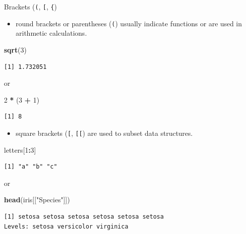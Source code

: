 \documentclass[ignorenonframetext,,t]{beamer}
\let\oldtextbf\textbf
\renewcommand{\textbf}[1]{\textcolor{spamwell}{\oldtextbf{#1}}}
\providecommand{\tightlist}{%
\setlength{\itemsep}{0pt}\setlength{\parskip}{0pt}}
\newenvironment{Shaded}{\begin{snugshade}}{\end{snugshade}}
\newcommand{\DecValTok}[1]{\textcolor[rgb]{0.00,0.00,0.81}{#1}}
\newcommand{\FunctionTok}[1]{\textcolor[rgb]{0.13,0.29,0.53}{\textbf{#1}}}
\newcommand{\NormalTok}[1]{#1}
\newcommand{\SpecialCharTok}[1]{\textcolor[rgb]{0.81,0.36,0.00}{\textbf{#1}}}
\newcommand{\StringTok}[1]{\textcolor[rgb]{0.31,0.60,0.02}{#1}}
\providecommand{\tightlist}{%
\setlength{\itemsep}{0pt}\setlength{\parskip}{0pt}}
\renewcommand{\tightlist}{\setlength{\itemsep}{1.4ex}\setlength{\parskip}{0pt}}
\begin{document}
\begin{frame}[fragile]
\begin{block}{Brackets (\texttt{(}, \texttt{{[}}, \texttt{\{})}
\label{brackets}
\begin{itemize}
\tightlist
\item
  round brackets or parentheses (\texttt{(}) usually indicate functions
  or are used in arithmetic calculations.
\end{itemize}

\begin{Shaded}
\begin{Highlighting}[]
\FunctionTok{sqrt}\NormalTok{(}\DecValTok{3}\NormalTok{)}
\end{Highlighting}
\end{Shaded}

\begin{verbatim}
[1] 1.732051
\end{verbatim}

or

\begin{Shaded}
\begin{Highlighting}[]
\DecValTok{2} \SpecialCharTok{*}\NormalTok{ (}\DecValTok{3} \SpecialCharTok{+} \DecValTok{1}\NormalTok{)}
\end{Highlighting}
\end{Shaded}

\begin{verbatim}
[1] 8
\end{verbatim}
\end{block}
\end{frame}

\begin{frame}[fragile]
\begin{itemize}
\tightlist
\item
  square brackets (\texttt{{[}}, \texttt{{[}{[}}) are used to subset
  data structures.
\end{itemize}

\begin{Shaded}
\begin{Highlighting}[]
\NormalTok{letters[}\DecValTok{1}\SpecialCharTok{:}\DecValTok{3}\NormalTok{]}
\end{Highlighting}
\end{Shaded}

\begin{verbatim}
[1] "a" "b" "c"
\end{verbatim}

or

\begin{Shaded}
\begin{Highlighting}[]
\FunctionTok{head}\NormalTok{(iris[[}\StringTok{"Species"}\NormalTok{]])}
\end{Highlighting}
\end{Shaded}

\begin{verbatim}
[1] setosa setosa setosa setosa setosa setosa
Levels: setosa versicolor virginica
\end{verbatim}
\end{frame}
\end{document}
